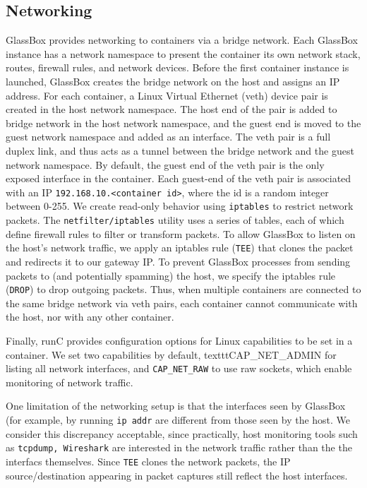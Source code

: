 \documentclass{proc}
\begin{document}
\subsection*{Networking}
GlassBox provides networking to containers via a bridge network. Each GlassBox instance has a network namespace to present the container its own network stack, routes, firewall rules, and network devices. Before the first container instance is launched, GlassBox creates the bridge network on the host and assigns an IP address. For each container, a Linux Virtual Ethernet (veth) device pair is created in the host network namespace. The host end of the pair is added to bridge network in the host network namespace, and the guest end is moved to the guest network namespace and added as an interface. The veth pair is a full duplex link, and thus acts as a tunnel between the bridge network and the guest network namespace. By default, the guest end of the veth pair is the only exposed interface in the container. Each guest-end of the veth pair is associated with an IP \texttt{192.168.10.<container id>}, where the id is a random integer between 0-255. 
We create read-only behavior using \texttt{iptables} to restrict network packets. The \texttt{netfilter/iptables} utility uses a series of tables, each of which define firewall rules to filter or transform packets. To allow GlassBox to listen on the host's network traffic, we apply an iptables rule (\texttt{TEE}) that clones the packet and redirects it to our gateway IP. To prevent GlassBox processes from sending packets to (and potentially spamming) the host, we specify the iptables rule (\texttt{DROP}) to drop outgoing packets. Thus, when multiple containers are connected to the same bridge network via veth pairs, each container cannot communicate with the host, nor with any other container. 

Finally, runC provides configuration options for Linux capabilities to be set in a container. We set two capabilities by default, texttt{CAP\_NET\_ADMIN} for listing all network interfaces, and \texttt{CAP\_NET\_RAW} to use raw sockets, which enable monitoring of network traffic.

One limitation of the networking setup is that the interfaces seen by GlassBox (for example, by running \texttt{ip addr} are different from those seen by the host. We consider this discrepancy acceptable, since practically, host monitoring tools such as \texttt{tcpdump, Wireshark} are interested in the network traffic rather than the the interfacs themselves. Since \texttt{TEE} clones the network packets, the IP source/destination appearing in packet captures still reflect the host interfaces. 
\end{document}

